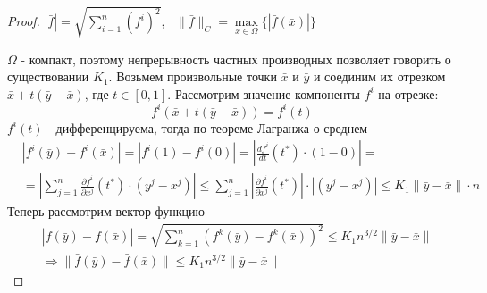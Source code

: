\begin{proof}
    
    $|\bar{f}| = \sqrt{\sum\limits_{i=1}^n (f^i)^2}$,~ $\|\bar{f}\|_C = \max\limits_{x \in \Omega}\{|\bar{f}(\bar{x})|\}$
    
    $\Omega$ - компакт, поэтому непрерывность частных производных позволяет говорить о существовании $K_1$. Возьмем произвольные точки $\bar{x}$ и $\bar{y}$ и соединим их отрезком $\bar{x} + t(\bar{y} - \bar{x})$, где $t\in[0, 1]$. Рассмотрим значение компоненты $f^i$ на отрезке:
    \[
        f^i(\bar{x} + t(\bar{y} - \bar{x})) = f^i(t)
    \]
    $f^i(t)$ - дифференцируема, тогда по теореме Лагранжа о среднем
    \begin{align*}
        &|f^i(\bar{y}) - f^i(\bar{x})| = |f^i(1) - f^i(0)| = \left| \frac{df^i}{dt}(t^*)\cdot(1-0)\right| = \\
        &= \left|\sum\limits_{j=1}^n\frac{\partial f^i}{\partial x^j}(t^*)\cdot(y^j - x^j)\right| \leqslant \sum\limits_{j=1}^n\left|\frac{\partial f^i}{\partial x^j}(t^*)\right|\cdot\left|(y^j - x^j)\right| \leqslant K_1\|\bar{y}-\bar{x}\|\cdot n
    \end{align*}
    Теперь рассмотрим вектор-функцию
    \begin{align*}
        &|\bar{f}(\bar{y}) - \bar{f}(\bar{x})| = \sqrt{\sum\limits_{k=1}^n (f^k(\bar{y}) - f^k(\bar{x}))^2} \leqslant K_1n^{3/2}\|\bar{y}-\bar{x}\| \\
        &\Rightarrow \|\bar{f}(\bar{y}) - \bar{f}(\bar{x})\| \leqslant K_1n^{3/2}\|\bar{y}-\bar{x}\|
    \end{align*}
\end{proof}

